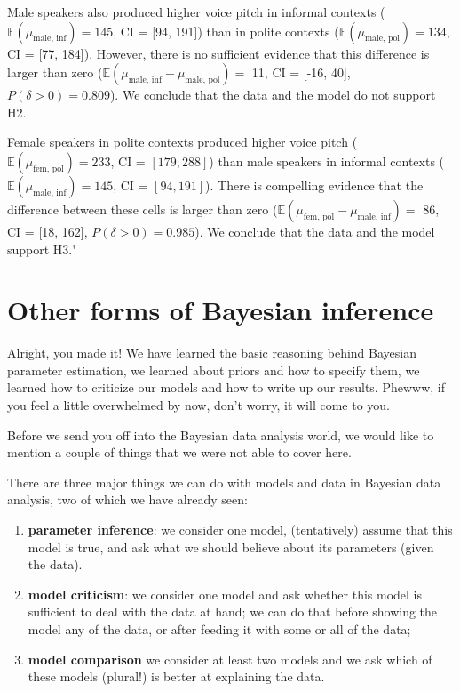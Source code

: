 \documentclass[nobib]{tufte-handout}
\begin{document}
Male speakers also produced higher voice pitch in informal contexts
($\mathbb{E}(\mu_{\text{male, inf}}) = 145$, CI = [94, 191]) than in polite contexts
($\mathbb{E}(\mu_{\text{male, pol}}) = 134$, CI = [77, 184]). However, there is no sufficient
evidence that this difference is larger than zero ($\mathbb{E}(\mu_{\text{male, inf}} - \mu_{\text{male, pol}}) =$ 11, CI =
[-16, 40], $P(\delta > 0) = 0.809$). We conclude that the data and the model do not
support H2.

Female speakers in polite contexts produced higher voice pitch ($\mathbb{E}(\mu_{\text{fem,
    pol}}) = 233$, CI = $[179, 288]$) than male speakers in informal contexts
($\mathbb{E}(\mu_{\text{male, inf}}) = 145$, CI = $[94, 191]$). There is compelling
evidence that the difference between these cells is larger than zero ($\mathbb{E}(\mu_{\text{fem,
    pol}} - \mu_{\text{male, inf}}) = $ 86, CI = [18, 162], $P(\delta >
0) = 0.985$). We conclude that the data and the model support H3."


\section{Other forms of Bayesian inference}

Alright, you made it! We have learned the basic reasoning behind Bayesian parameter estimation, we learned about priors and how to specify them, we learned how to criticize our models and how to write up our results. Phewww, if you feel a little overwhelmed by now, don't worry, it will come to you.

Before we send you off into the Bayesian data analysis world, we would like to mention a couple of things that we were not able to cover here.

There are three major things we can do with models and data in Bayesian data analysis, two of which we have already seen:

\begin{enumerate}
\item \textbf{parameter inference}: we consider one model, (tentatively) assume that this model is true, and ask what we should believe about its parameters (given the data). 
\item \textbf{model criticism}: we consider one model and ask whether this model is sufficient to deal with the data at hand; we can do that before showing the model any of the data, or after feeding it with some or all of the data;
\item \textbf{model comparison} we consider at least two models and we ask which of these models (plural!) is better at explaining the data.
\end{enumerate}
\end{document}
